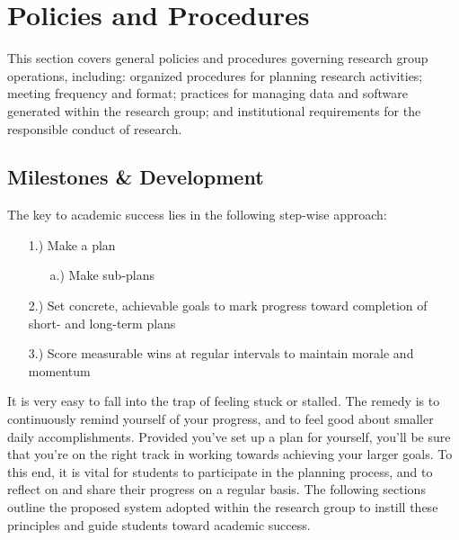 \documentclass[12pt,a4paper,article,oneside]{memoir} %
\begin{document}

\newpage

\chapter{Policies and Procedures} \label{sec:policies_and_procedures}

This section covers general policies and procedures governing research group operations, including: organized procedures for planning research activities; meeting frequency and format; practices for managing data and software generated within the research group; and institutional requirements for the responsible conduct of research.


\section{Milestones \& Development}

The key to academic success lies in the following step-wise approach:
\begin{itemize}
\item[1.)] Make a plan
\begin{itemize}
\item[a.)] Make sub-plans
\end{itemize}
\item[2.)] Set concrete, achievable goals to mark progress toward completion of short- and long-term plans
\item[3.)] Score measurable wins at regular intervals to maintain morale and momentum
\end{itemize}
It is very easy to fall into the trap of feeling stuck or stalled. The remedy is to continuously remind yourself of your progress, and to feel good about smaller daily accomplishments. Provided you've set up a plan for yourself, you'll be sure that you're on the right track in working towards achieving your larger goals. To this end, it is vital for students to participate in the planning process, and to reflect on and share their progress on a regular basis. The following sections outline the proposed system adopted within the research group to instill these principles and guide students toward academic success.
\end{document}
